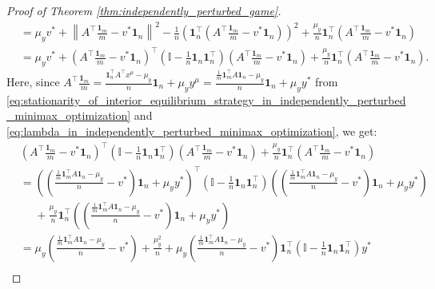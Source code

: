 \documentclass{article}
\newcommand{\bone}{\mathbf{1}}
\theoremstyle{plain}
\begin{document}
\begin{proof}[Proof of Theorem \ref{thm:independently_perturbed_game}]
\begin{align}
        & = \mu_y v^{\ast} + \left\|A^{\top}\frac{\bone_m}{m} - v^{\ast}\bone_n\right\|^2 - \frac{1}{n}\left(\bone_n^{\top}\left(A^{\top}\frac{\bone_m}{m} - v^{\ast}\bone_n\right)\right)^2 + \frac{\mu_y}{n}\bone_n^{\top}\left(A^{\top}\frac{\bone_m}{m} - v^{\ast}\bone_n\right) \nonumber                                                \\
        & = \mu_y v^{\ast} + \left(A^{\top}\frac{\bone_m}{m} - v^{\ast}\bone_n\right)^{\top}\left(\mathbb{I} - \frac{1}{n}\bone_n\bone_n^{\top}\right)\left(A^{\top}\frac{\bone_m}{m} - v^{\ast}\bone_n\right) + \frac{\mu_y}{n}\bone_n^{\top}\left(A^{\top}\frac{\bone_m}{m} - v^{\ast}\bone_n\right).
        \label{eq:tmp3}
    \end{align}
    Here, since $A^{\top}\frac{\bone_m}{m} = \frac{\bone_n^{\top}A^{\top}x^{\mu} - \mu_y}{n} \bone_n + \mu_y y^{\mu} = \frac{\frac{1}{m}\bone_m^{\top}A\bone_n - \mu_y}{n} \bone_n + \mu_y y^{\ast}$ from \eqref{eq:stationarity_of_interior_equilibrium_strategy_in_independently_perturbed_minimax_optimization} and \eqref{eq:lambda_in_independently_perturbed_minimax_optimization}, we get:
    \begin{align}
        & \left(A^{\top}\frac{\bone_m}{m} - v^{\ast}\bone_n\right)^{\top}\left(\mathbb{I} - \frac{1}{n}\bone_n\bone_n^{\top}\right)\left(A^{\top}\frac{\bone_m}{m} - v^{\ast}\bone_n\right) + \frac{\mu_y}{n}\bone_n^{\top}\left(A^{\top}\frac{\bone_m}{m} - v^{\ast}\bone_n\right) \nonumber                             \\
        & = \left(\left(\frac{\frac{1}{m}\bone_m^{\top}A\bone_n - \mu_y}{n} - v^{\ast}\right) \bone_n + \mu_y y^{\ast}\right)^{\top}\left(\mathbb{I} - \frac{1}{n}\bone_n\bone_n^{\top}\right)\left(\left(\frac{\frac{1}{m}\bone_m^{\top}A\bone_n - \mu_y}{n} - v^{\ast}\right) \bone_n + \mu_y y^{\ast}\right) \nonumber \\
        & \phantom{=} + \frac{\mu_y}{n}\bone_n^{\top}\left(\left(\frac{\frac{1}{m}\bone_m^{\top}A\bone_n - \mu_y}{n} - v^{\ast}\right) \bone_n + \mu_y y^{\ast}\right) \nonumber                                                                                                                                          \\
        & = \mu_y\left(\frac{\frac{1}{m}\bone_m^{\top}A\bone_n - \mu_y}{n} - v^{\ast}\right) + \frac{\mu_y^2}{n} + \mu_y\left(\frac{\frac{1}{m}\bone_m^{\top}A\bone_n - \mu_y}{n} - v^{\ast}\right)\bone_n^{\top}\left(\mathbb{I} - \frac{1}{n}\bone_n\bone_n^{\top}\right)y^{\ast} \nonumber                             \\

\end{align}
\end{proof}
\end{document}
